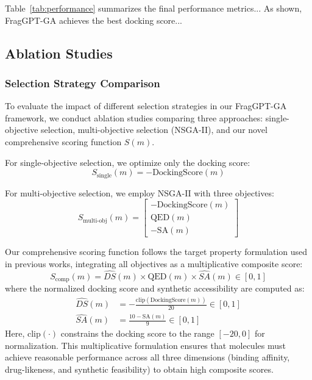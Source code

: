 \documentclass[lettersize,journal]{IEEEtran}
\begin{document}
Table~\ref{tab:performance} summarizes the final performance metrics... As shown, FragGPT-GA achieves the best docking score...
\subsection{Ablation Studies}

\subsubsection{Selection Strategy Comparison}
To evaluate the impact of different selection strategies in our FragGPT-GA framework, we conduct ablation studies comparing three approaches: single-objective selection, multi-objective selection (NSGA-II), and our novel comprehensive scoring function $S(m)$. 

For single-objective selection, we optimize only the docking score:
\begin{equation}
S_{\text{single}}(m) = -\text{DockingScore}(m)
\end{equation}

For multi-objective selection, we employ NSGA-II with three objectives:
\begin{equation}
    S_{\text{multi-obj}}(m) = \begin{bmatrix} -\text{DockingScore}(m) \\ \text{QED}(m) \\ -\text{SA}(m) \end{bmatrix}
\end{equation}

Our comprehensive scoring function follows the target property formulation used in previous works, integrating all objectives as a multiplicative composite score:
\begin{equation}
S_{\text{comp}}(m) =  \widehat{DS}(m) \times \text{QED}(m) \times \widehat{SA}(m) \in [0,1]
\end{equation}
where the normalized docking score and synthetic accessibility are computed as:
\begin{align}
\widehat{DS}(m) &= -\frac{\text{clip}(\text{DockingScore}(m))}{20} \in [0,1] \\
\widehat{SA}(m) &= \frac{10 - \text{SA}(m)}{9} \in [0,1]
\end{align}
Here, $\text{clip}(\cdot)$ constrains the docking score to the range $[-20, 0]$ for normalization. This multiplicative formulation ensures that molecules must achieve reasonable performance across all three dimensions (binding affinity, drug-likeness, and synthetic feasibility) to obtain high composite scores.
\end{document}
